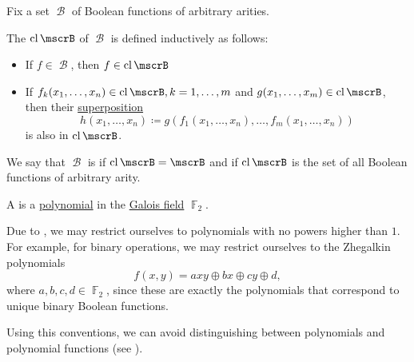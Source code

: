 \begin{definition}\label{def:boolean_closure}
  Fix a set \( \mscrB \) of Boolean functions of arbitrary arities.

  The  \( \cl{\mscrB} \) of \( \mscrB \) is defined inductively as follows:
  \begin{itemize}
    \item If \( f \in \mscrB \), then \( f \in \cl{\mscrB} \)
    \item If \( f_k(x_1, \ldots, x_n) \in \cl{\mscrB}, k = 1, \ldots, m \) and \( g(x_1, \ldots, x_m) \in \cl{\mscrB} \), then their \hyperref[def:function/superposition]{superposition}
    \begin{equation*}
      h(x_1, \ldots, x_n) \coloneqq g(f_1(x_1, \ldots, x_n), \ldots, f_m(x_1, \ldots, x_n))
    \end{equation*}
    is also in \( \cl{\mscrB} \).
  \end{itemize}

  We say that \( \mscrB \) is  if \( \cl{\mscrB} = \mscrB \) and  if \( \cl{\mscrB} \) is the set of all Boolean functions of arbitrary arity.
\end{definition}

\begin{definition}\label{def:zhegalkin_polynomial}
  A  is a \hyperref[def:polynomial]{polynomial} in the \hyperref[thm:galois_field_existence]{Galois field} \( \BbbF_2 \).

  Due to , we may restrict ourselves to polynomials with no powers higher than \( 1 \). For example, for binary operations, we may restrict ourselves to the Zhegalkin polynomials
  \begin{equation}\label{eq:def:zhegalkin_polynomial/binary_polynomial}
    f(x, y) = axy \oplus bx \oplus cy \oplus d,
  \end{equation}
  where \( a, b, c, d \in \BbbF_2 \), since these are exactly the polynomials that correspond to unique binary Boolean functions.

  Using this conventions, we can avoid distinguishing between polynomials and polynomial functions (see ).
\end{definition}

